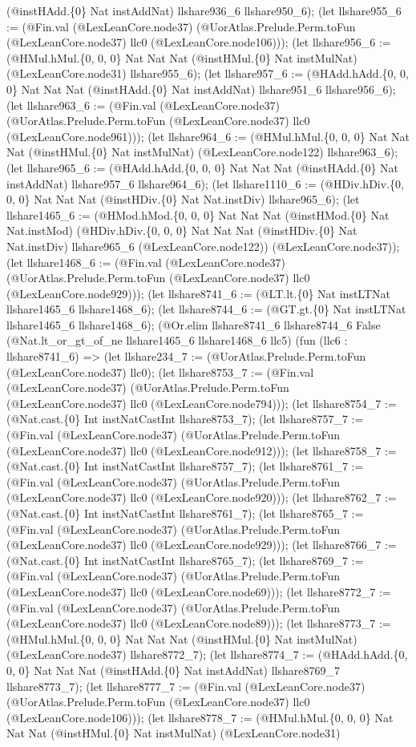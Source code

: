 \documentclass[11pt]{article}
\begin{document}
(@instHAdd.\{0\} Nat instAddNat) llshare936\_6 llshare950\_6); (let llshare955\_6 := (@Fin.val (@LexLeanCore.node37) (@UorAtlas.Prelude.Perm.toFun (@LexLeanCore.node37) llc0 (@LexLeanCore.node106))); (let llshare956\_6 := (@HMul.hMul.\{0, 0, 0\} Nat Nat Nat (@instHMul.\{0\} Nat instMulNat) (@LexLeanCore.node31) llshare955\_6); (let llshare957\_6 := (@HAdd.hAdd.\{0, 0, 0\} Nat Nat Nat (@instHAdd.\{0\} Nat instAddNat) llshare951\_6 llshare956\_6); (let llshare963\_6 := (@Fin.val (@LexLeanCore.node37) (@UorAtlas.Prelude.Perm.toFun (@LexLeanCore.node37) llc0 (@LexLeanCore.node961))); (let llshare964\_6 := (@HMul.hMul.\{0, 0, 0\} Nat Nat Nat (@instHMul.\{0\} Nat instMulNat) (@LexLeanCore.node122) llshare963\_6); (let llshare965\_6 := (@HAdd.hAdd.\{0, 0, 0\} Nat Nat Nat (@instHAdd.\{0\} Nat instAddNat) llshare957\_6 llshare964\_6); (let llshare1110\_6 := (@HDiv.hDiv.\{0, 0, 0\} Nat Nat Nat (@instHDiv.\{0\} Nat Nat.instDiv) llshare965\_6); (let llshare1465\_6 := (@HMod.hMod.\{0, 0, 0\} Nat Nat Nat (@instHMod.\{0\} Nat Nat.instMod) (@HDiv.hDiv.\{0, 0, 0\} Nat Nat Nat (@instHDiv.\{0\} Nat Nat.instDiv) llshare965\_6 (@LexLeanCore.node122)) (@LexLeanCore.node37)); (let llshare1468\_6 := (@Fin.val (@LexLeanCore.node37) (@UorAtlas.Prelude.Perm.toFun (@LexLeanCore.node37) llc0 (@LexLeanCore.node929))); (let llshare8741\_6 := (@LT.lt.\{0\} Nat instLTNat llshare1465\_6 llshare1468\_6); (let llshare8744\_6 := (@GT.gt.\{0\} Nat instLTNat llshare1465\_6 llshare1468\_6); (@Or.elim llshare8741\_6 llshare8744\_6 False (@Nat.lt\_or\_gt\_of\_ne llshare1465\_6 llshare1468\_6 llc5) (fun (llc6 : llshare8741\_6) => (let llshare234\_7 := (@UorAtlas.Prelude.Perm.toFun (@LexLeanCore.node37) llc0); (let llshare8753\_7 := (@Fin.val (@LexLeanCore.node37) (@UorAtlas.Prelude.Perm.toFun (@LexLeanCore.node37) llc0 (@LexLeanCore.node794))); (let llshare8754\_7 := (@Nat.cast.\{0\} Int instNatCastInt llshare8753\_7); (let llshare8757\_7 := (@Fin.val (@LexLeanCore.node37) (@UorAtlas.Prelude.Perm.toFun (@LexLeanCore.node37) llc0 (@LexLeanCore.node912))); (let llshare8758\_7 := (@Nat.cast.\{0\} Int instNatCastInt llshare8757\_7); (let llshare8761\_7 := (@Fin.val (@LexLeanCore.node37) (@UorAtlas.Prelude.Perm.toFun (@LexLeanCore.node37) llc0 (@LexLeanCore.node920))); (let llshare8762\_7 := (@Nat.cast.\{0\} Int instNatCastInt llshare8761\_7); (let llshare8765\_7 := (@Fin.val (@LexLeanCore.node37) (@UorAtlas.Prelude.Perm.toFun (@LexLeanCore.node37) llc0 (@LexLeanCore.node929))); (let llshare8766\_7 := (@Nat.cast.\{0\} Int instNatCastInt llshare8765\_7); (let llshare8769\_7 := (@Fin.val (@LexLeanCore.node37) (@UorAtlas.Prelude.Perm.toFun (@LexLeanCore.node37) llc0 (@LexLeanCore.node69))); (let llshare8772\_7 := (@Fin.val (@LexLeanCore.node37) (@UorAtlas.Prelude.Perm.toFun (@LexLeanCore.node37) llc0 (@LexLeanCore.node89))); (let llshare8773\_7 := (@HMul.hMul.\{0, 0, 0\} Nat Nat Nat (@instHMul.\{0\} Nat instMulNat) (@LexLeanCore.node37) llshare8772\_7); (let llshare8774\_7 := (@HAdd.hAdd.\{0, 0, 0\} Nat Nat Nat (@instHAdd.\{0\} Nat instAddNat) llshare8769\_7 llshare8773\_7); (let llshare8777\_7 := (@Fin.val (@LexLeanCore.node37) (@UorAtlas.Prelude.Perm.toFun (@LexLeanCore.node37) llc0 (@LexLeanCore.node106))); (let llshare8778\_7 := (@HMul.hMul.\{0, 0, 0\} Nat Nat Nat (@instHMul.\{0\} Nat instMulNat) (@LexLeanCore.node31) 
\end{document}
